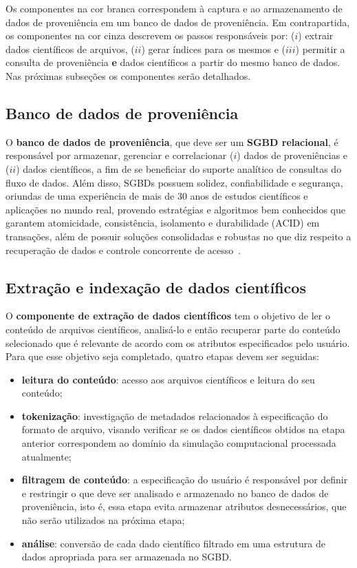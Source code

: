 Os componentes na cor branca correspondem à captura e ao armazenamento de dados de proveniência em um banco de dados de proveniência. Em contrapartida, os componentes na cor cinza descrevem os passos responsáveis por: (\(i\)) extrair dados científicos de arquivos, (\(ii\)) gerar índices para os mesmos e (\(iii\)) permitir a consulta de proveniência \textbf{e} dados científicos a partir do mesmo banco de dados. Nas próximas subseções os componentes serão detalhados.

\subsection{Banco de dados de proveniência}%
\label{subsec:banco-de-dados-de-proveniencia}

O \textbf{banco de dados de proveniência}, que deve ser um \textbf{SGBD relacional}, é responsável por armazenar, gerenciar e correlacionar (\(i\)) dados de proveniências e (\(ii\)) dados científicos, a fim de se beneficiar do suporte analítico de consultas do fluxo de dados. Além disso, SGBDs possuem solidez, confiabilidade e segurança, oriundas de uma experiência de mais de 30 anos de estudos científicos e aplicações no mundo real, provendo estratégias e algoritmos bem conhecidos que garantem atomicidade, consistência, isolamento e durabilidade (ACID) em transações, além de possuir soluções consolidadas e robustas no que diz respeito a recuperação de dados e controle concorrente de acesso~\cite{ozsu2011principles}.

\subsection{Extração e indexação de dados científicos}

O \textbf{componente de extração de dados científicos} tem o objetivo de ler o conteúdo de arquivos científicos, analisá-lo e então recuperar parte do conteúdo selecionado que é relevante de acordo com os atributos especificados pelo usuário. Para que esse objetivo seja completado, quatro etapas devem ser seguidas:

\begin{itemize}
    \item \textbf{leitura do conteúdo}: acesso aos arquivos científicos e leitura do seu conteúdo;
    \item \textbf{tokenização}: investigação de metadados relacionados à especificação do formato de arquivo, visando verificar se os dados científicos obtidos na etapa anterior correspondem ao domínio da simulação computacional processada atualmente;
    \item \textbf{filtragem de conteúdo}: a especificação do usuário é responsável por definir e restringir o que deve ser analisado e armazenado no banco de dados de proveniência, isto é, essa etapa evita armazenar atributos desnecessários, que não serão utilizados na próxima etapa;
    \item \textbf{análise}: conversão de cada dado científico filtrado em uma estrutura de dados apropriada para ser armazenada no SGBD.
\end{itemize}

